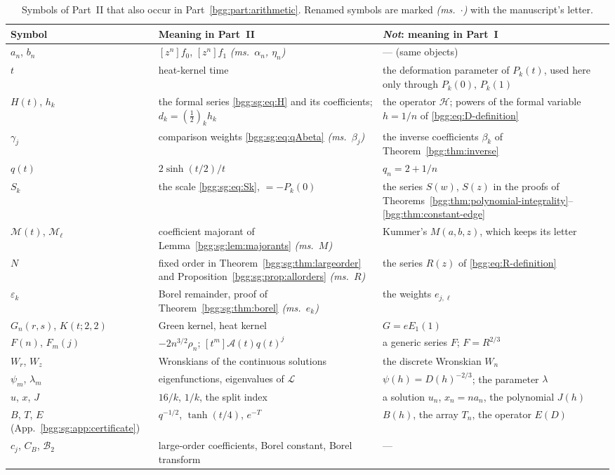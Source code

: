 \documentclass[11pt,a4paper]{article}
\numberwithin{equation}{section}
\theoremstyle{definition}
\theoremstyle{remark}
\theoremstyle{definition}
\newcommand{\Hop}{\mathcal H}
\begin{document}
\begin{table}[ht]
\centering\small
\caption{Symbols of Part~II that also occur in
Part~\ref{bgg:part:arithmetic}. Renamed symbols are marked
\emph{(ms.\ $\cdot$)} with the manuscript's letter.}
\label{bgg:sg:tab:notation}
\begin{tabular}{@{}>{\raggedright\arraybackslash}p{}
>{\raggedright\arraybackslash}p{}
>{\raggedright\arraybackslash}p{}@{}}
\toprule
Symbol & Meaning in Part~II & \emph{Not}: meaning in Part~I\\
\midrule
$a_n$, $b_n$ & $[z^n]f_0$, $[z^n]f_1$ \emph{(ms.\ $\alpha_n$, $\eta_n$)} & --- (same objects)\\
$t$ & heat-kernel time & the deformation parameter of $P_k(t)$, used here only through $P_k(0)$, $P_k(1)$\\
$H(t)$, $h_k$ & the formal series \eqref{bgg:sg:eq:H} and its coefficients; $d_k=(\tfrac12)_kh_k$ & the operator $\Hop$; powers of the formal variable $h=1/n$ of \eqref{bgg:eq:D-definition}\\
$\gamma_j$ & comparison weights \eqref{bgg:sg:eq:qAbeta} \emph{(ms.\ $\beta_j$)} & the inverse coefficients $\beta_k$ of Theorem~\ref{bgg:thm:inverse}\\
$q(t)$ & $2\sinh(t/2)/t$ & $q_n=2+1/n$\\
$S_k$ & the scale \eqref{bgg:sg:eq:Sk}, $=-P_k(0)$ & the series $S(w)$, $S(z)$ in the proofs of Theorems~\ref{bgg:thm:polynomial-integrality}--\ref{bgg:thm:constant-edge}\\
$\mathcal M(t)$, $\mathcal M_\ell$ & coefficient majorant of Lemma~\ref{bgg:sg:lem:majorants} \emph{(ms.\ $M$)} & Kummer's $M(a,b,z)$, which keeps its letter\\
$N$ & fixed order in Theorem~\ref{bgg:sg:thm:largeorder} and Proposition~\ref{bgg:sg:prop:allorders} \emph{(ms.\ $R$)} & the series $R(z)$ of \eqref{bgg:eq:R-definition}\\
$\varepsilon_k$ & Borel remainder, proof of Theorem~\ref{bgg:sg:thm:borel} \emph{(ms.\ $e_k$)} & the weights $e_{j,\ell}$\\
$G_n(r,s)$, $K(t;2,2)$ & Green kernel, heat kernel & $G=eE_1(1)$\\
$F(n)$, $F_m(j)$ & $-2n^{3/2}\rho_n$; $[t^m]\mathcal A(t)q(t)^j$ & a generic series $F$; $F=R^{2/3}$\\
$W_r$, $W_z$ & Wronskians of the continuous solutions & the discrete Wronskian $W_n$\\
$\psi_m$, $\lambda_m$ & eigenfunctions, eigenvalues of $\mathscr L$ & $\psi(h)=D(h)^{-2/3}$; the parameter $\lambda$\\
$u$, $x$, $J$ & $16/k$, $1/k$, the split index & a solution $u_n$, $x_n=na_n$, the polynomial $J(h)$\\
$B$, $T$, $E$ (App.~\ref{bgg:sg:app:certificate}) & $q^{-1/2}$, $\tanh(t/4)$, $e^{-T}$ & $B(h)$, the array $T_n$, the operator $E(D)$\\
$c_j$, $C_{\!B}$, $\mathscr B_2$ & large-order coefficients, Borel constant, Borel transform & ---\\
\bottomrule
\end{tabular}
\end{table}
\end{document}
